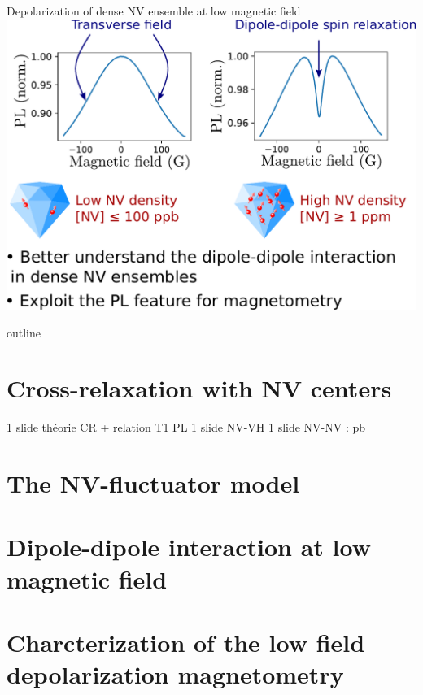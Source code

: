 \documentclass{beamer}
\begin{document}
\begin{frame}{Depolarization of dense NV ensemble at low magnetic field}
\centering
\includegraphics[width=\textwidth,height=0.9\textheight,keepaspectratio]{slide_presentation_sujet}

\begin{frame}{outline}
\tableofcontents
\end{frame}

\section{Cross-relaxation with NV centers}
1 slide théorie CR + relation T1 PL
1 slide NV-VH
1 slide NV-NV : pb
\section{The NV-fluctuator model}

\section{Dipole-dipole interaction at low magnetic field}

\section{Charcterization of the low field depolarization magnetometry}


\end{frame}
\end{document}
